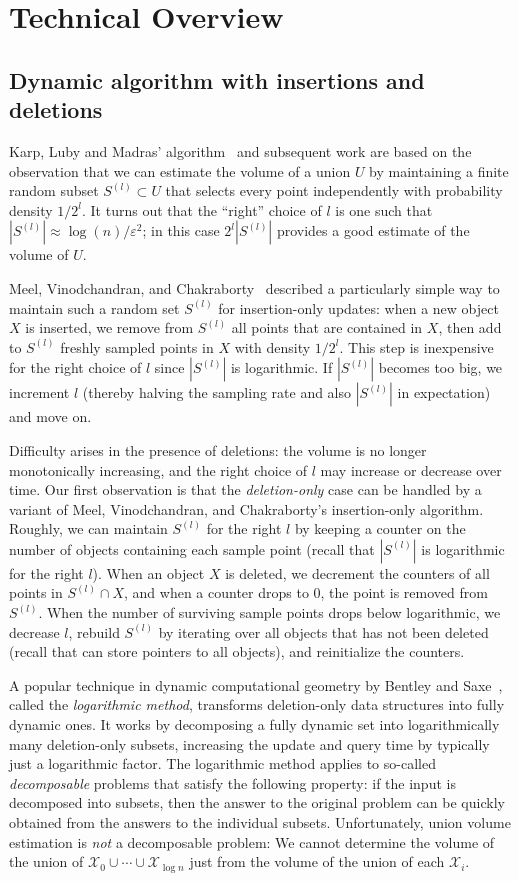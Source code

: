 \documentclass[a4paper, 11pt]{article}
\newcommand{\eps}{\varepsilon}
\newcommand{\class}[1]{\mathcal{#1}}
\begin{document}
\section{Technical Overview}

\subsection{Dynamic algorithm with insertions and deletions}
Karp, Luby and Madras' algorithm~\cite{KarpLM89} and subsequent work are based on the observation that we can estimate the volume of a union $U$ by maintaining a finite random subset $S^{(l)} \subset U$ that selects every point independently with probability density $1/2^l$. It turns out that the ``right'' choice of $l$ is one such that $|S^{(l)}| \approx \log(n)/\eps^2$; in this case $2^l|S^{(l)}|$ provides a good estimate of the volume of $U$.

Meel, Vinodchandran, and Chakraborty~\cite{MVC21} described a particularly simple way to maintain such a random set $S^{(l)}$ for insertion-only updates: when a new object $X$ is inserted, we remove from $S^{(l)}$ all points that are contained in $X$, then add to $S^{(l)}$ freshly sampled points in $X$ with density $1/2^l$. This step is inexpensive for the right choice of $l$ since $|S^{(l)}|$ is logarithmic. If $|S^{(l)}|$ becomes too big, we increment $l$ (thereby halving the sampling rate and also $|S^{(l)}|$ in expectation) and move on.

Difficulty arises in the presence of deletions: the volume is no longer monotonically increasing, and the right choice of $l$ may increase or decrease over time. Our first observation is that the \emph{deletion-only} case can be handled by a variant of Meel, Vinodchandran, and Chakraborty's insertion-only algorithm. Roughly, we can maintain $S^{(l)}$ for the right $l$ by keeping a counter on the number of objects containing each sample point (recall that $|S^{(l)}|$ is logarithmic for the right $l$). When an object $X$ is deleted, we decrement the counters of all points in $S^{(l)} \cap X$, and when a counter drops to 0, the point is removed from $S^{(l)}$. When the number of surviving sample points drops below logarithmic, we decrease $l$, rebuild $S^{(l)}$ by iterating over all objects that has not been deleted (recall that can store pointers to all objects), and reinitialize the counters.

A popular technique in dynamic computational geometry by Bentley and Saxe~\cite{BS80}, called the \emph{logarithmic method}, transforms deletion-only data structures into fully dynamic ones. It works by decomposing a fully dynamic set into logarithmically many deletion-only subsets, increasing the update and query time by typically just a logarithmic factor. The logarithmic method applies to so-called \emph{decomposable} problems that satisfy the following property:
if the input is decomposed into subsets, then the answer to the original problem can be quickly obtained from the answers to the individual subsets. Unfortunately, union volume estimation is \emph{not} a decomposable problem: We cannot determine the volume of the union of $\class{X}_0\cup \cdots \cup \class{X}_{\log n}$ just from the volume of the union of each $\class{X}_i$.
\end{document}
